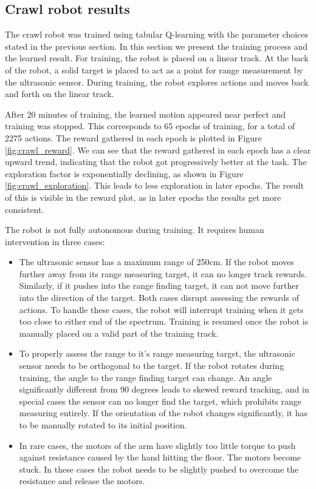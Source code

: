 \documentclass[11pt, a4paper]{article}
\begin{document}
	
	
	
	
	\subsection{Crawl robot results}
	The crawl robot was trained using tabular Q-learning with the parameter choices stated in the previous section. In this section we present the training process and the learned result. For training, the robot is placed on a linear track. At the back of the robot, a solid target is placed to act as a point for range measurement by the ultrasonic sensor. During training, the robot explores actions and moves back and forth on the linear track. 
	
	After 20 minutes of training, the learned motion appeared near perfect and training was stopped. This corresponds to 65 epochs of training, for a total of 2275 actions. The reward gathered in each epoch is plotted in Figure \ref{fig:crawl_reward}. We can see that the reward gathered in each epoch has a clear upward trend, indicating that the robot got progressively better at the task. The exploration factor is exponentially declining, as shown in Figure \ref{fig:crawl_exploration}. This leads to less exploration in later epochs. The result of this is visible in the reward plot, as in later epochs the results get more consistent.
	
	The robot is not fully autonomous during training. It requires human intervention in three cases:
	\begin{itemize}
		\item The ultrasonic sensor has a maximum range of 250cm. If the robot moves further away from its range measuring target, it can no longer track rewards. Similarly, if it pushes into the range finding target, it can not move further into the direction of the target. Both cases disrupt assessing the rewards of actions. To handle these cases, the robot will interrupt training when it gets too close to either end of the spectrum. Training is resumed once the robot is manually placed on a valid part of the training track.
		\item To properly assess the range to it's range measuring target, the ultrasonic sensor needs to be orthogonal to the target. If the robot rotates during training, the angle to the range finding target can change. An angle significantly different from 90 degrees leads to skewed reward tracking, and in special cases the sensor can no longer find the target, which prohibits range measuring entirely. If the orientation of the robot changes significantly, it has to be manually rotated to its initial position.
		\item In rare cases, the motors of the arm have slightly too little torque to push against resistance caused by the hand hitting the floor. The motors become stuck. In these cases the robot needs to be slightly pushed to overcome the resistance and release the motors.
	\end{itemize}
	
\end{document}
